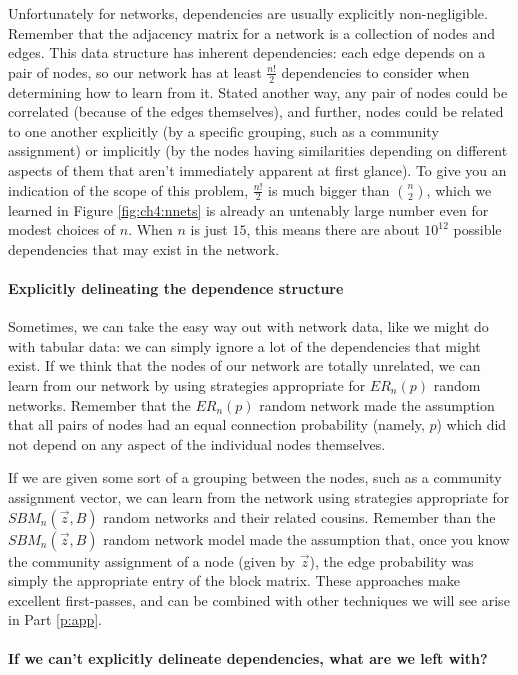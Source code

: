 Unfortunately for networks, dependencies are usually explicitly non-negligible. Remember that the adjacency matrix for a network is a collection of nodes and edges. This data structure has inherent dependencies: each edge depends on a pair of nodes, so our network has {at least} $\frac{n!}{2}$ dependencies to consider when determining how to learn from it. Stated another way, any pair of nodes could be correlated (because of the edges themselves), and further, nodes could be related to one another explicitly (by a specific grouping, such as a community assignment) or implicitly (by the nodes having similarities depending on different aspects of them that aren't immediately apparent at first glance). To give you an indication of the scope of this problem, $\frac{n!}{2}$ is much bigger than $\binom n 2$, which we learned in Figure \ref{fig:ch4:nnets} is already an untenably large number even for modest choices of $n$. When $n$ is just $15$, this means there are about $10^{12}$ possible dependencies that may exist in the network.

\paragraph*{Explicitly delineating the dependence structure}

Sometimes, we can take the easy way out with network data, like we might do with tabular data: we can simply ignore a lot of the dependencies that might exist. If we think that the nodes of our network are totally unrelated, we can learn from our network by using strategies appropriate for $ER_n(p)$ random networks. Remember that the $ER_n(p)$ random network made the assumption that all pairs of nodes had an equal connection probability (namely, $p$) which did not depend on any aspect of the individual nodes themselves. 

If we are given some sort of a grouping between the nodes, such as a community assignment vector, we can learn from the network using strategies appropriate for $SBM_n(\vec z, B)$ random networks and their related cousins. Remember than the $SBM_n(\vec z, B)$ random network model made the assumption that, once you know the community assignment of a node (given by $\vec z$), the edge probability was simply the appropriate entry of the block matrix. These approaches make excellent first-passes, and can be combined with other techniques we will see arise in Part \ref{p:app}.

\paragraph*{If we can't explicitly delineate dependencies, what are we left with?}

